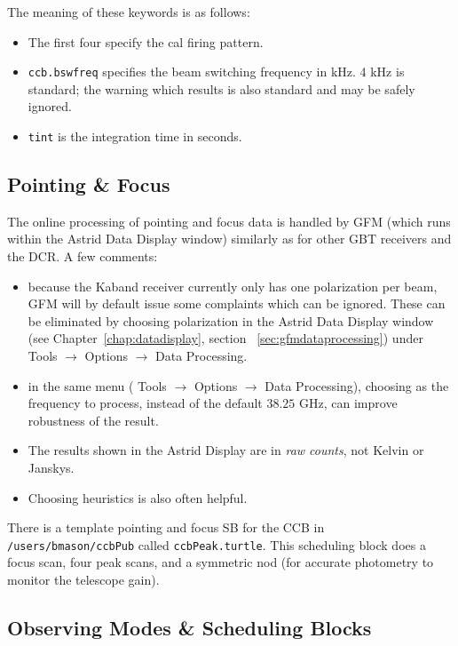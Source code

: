 \noindent The meaning of these keywords is as follows:
\begin{itemize}
\item The first four specify the cal firing pattern.
\item {\tt ccb.bswfreq} specifies the beam switching frequency in kHz.
4 kHz is standard; the  warning which results is
also standard and may be safely ignored.
\item {\tt tint} is the integration time in seconds.
\end{itemize}

\newpage

\subsection{Pointing \& Focus}

The online processing of pointing and focus data is handled by \gls{GFM}
(which runs within the Astrid Data Display window)
similarly as for other \gls{GBT} receivers and the \gls{DCR}. A few 
comments:
\begin{itemize}
\item because the \gls{Kaband} receiver currently only has one polarization
per beam, \gls{GFM} will by default issue some complaints which can be ignored.
These can be eliminated by choosing  polarization in 
the \gls{Astrid} Data Display window (see Chapter~\ref{chap:datadisplay}, section ~\ref{sec:gfmdataprocessing})
under Tools $\rightarrow$ Options $\rightarrow$ Data Processing.
\item in the same menu ( Tools $\rightarrow$ Options $\rightarrow$ Data Processing),
choosing  as the frequency to process, instead of the
default $38.25$ GHz, can improve robustness of the result.
\item The results shown in the Astrid Display are in {\it raw counts}, not Kelvin
or Janskys.
\item Choosing  heuristics is also often helpful.
\end{itemize}

There is a template pointing and focus \gls{SB} for the CCB in 
{\tt /users/bmason/ccbPub} called {\tt ccbPeak.turtle}. This scheduling
block does a focus scan, four peak scans, and a symmetric nod (for
accurate photometry to monitor the telescope gain).


\subsection{Observing Modes \& Scheduling Blocks}

